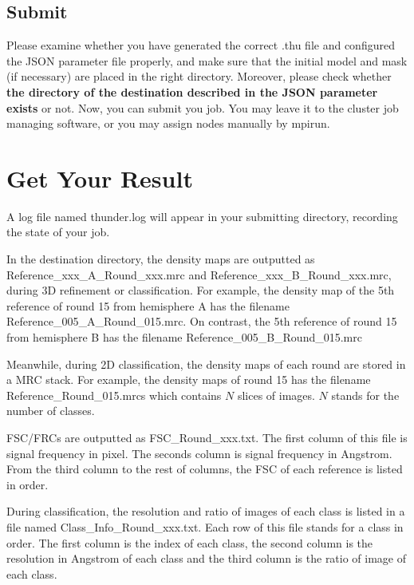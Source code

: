 \documentclass{article}
\begin{document}
        \subsection{Submit}
        
            Please examine whether you have generated the correct \textsf{.thu} file and configured the JSON parameter file properly, and make sure that the initial model and mask (if necessary) are placed in the right directory. Moreover, please check whether \textbf{the directory of the destination described in the JSON parameter exists} or not. Now, you can submit you job. You may leave it to the cluster job managing software, or you may assign nodes manually by \textsf{mpirun}.
    
    \section{Get Your Result}
    
        A log file named \textsf{thunder.log} will appear in your submitting directory, recording the state of your job.
        
        In the destination directory, the density maps are outputted as \textsf{Reference\_xxx\_A\_Round\_xxx.mrc} and \textsf{Reference\_xxx\_B\_Round\_xxx.mrc}, during 3D refinement or classification. For example, the density map of the 5th reference of round 15 from hemisphere A has the filename \textsf{Reference\_005\_A\_Round\_015.mrc}. On contrast, the 5th reference of round 15 from hemisphere B has the filename \textsf{Reference\_005\_B\_Round\_015.mrc}
        
        Meanwhile, during 2D classification, the density maps of each round are stored in a MRC stack. For example, the density maps of round 15 has the filename \textsf{Reference\_Round\_015.mrcs} which contains $N$ slices of images. $N$ stands for the number of classes.

        FSC/FRCs are outputted as \textsf{FSC\_Round\_xxx.txt}. The first column of this file is signal frequency in pixel. The seconds column is signal frequency in Angstrom. From the third column to the rest of columns, the FSC of each reference is listed in order.
        
        During classification, the resolution and ratio of images of each class is listed in a file named \textsf{Class\_Info\_Round\_xxx.txt}. Each row of this file stands for a class in order. The first column is the index of each class, the second column is the resolution in Angstrom of each class and the third column is the ratio of image of each class.
\end{document}
